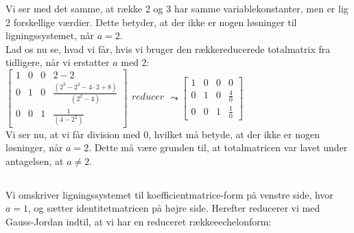 \documentclass[a4paper,12pt]{article}
\begin{document}
Vi ser med det samme, at række 2 og 3 har samme variablekonstanter, men er lig 2 forskellige værdier. Dette betyder, at der ikke er nogen løsninger til ligningssystemet, når $a=2$.\\

Lad os nu se, hvad vi får, hvis vi bruger den rækkereducerede totalmatrix fra tidligere, når vi erstatter $a$ med 2:\\

$
\left[\begin{array}{ccc|c}
    1 & 0 & 0 & 2-2 \\
    0 & 1 & 0 & \frac{(2^3 - 2^2 - 4\cdot 2 + 8)}{(2^2 - 4)} \\
    0 & 0 & 1 & \frac{1}{(4-2^2)}
\end{array}\right]
\begin{array}{ccc}
    \\
    reducer\\
    \\
\end{array}
\leadsto
\left[\begin{array}{ccc|c}
    1 & 0 & 0 & 0 \\
    0 & 1 & 0 & \frac{4}{0} \\
    0 & 0 & 1 & \frac{1}{0}
\end{array}\right]
$\\

Vi ser nu, at vi får division med 0, hvilket må betyde, at der ikke er nogen løsninger, når $a=2$. Dette må være grunden til, at totalmatricen var lavet under antagelsen, at $a\neq 2$.\\

\subsection{}
Vi omskriver ligningssystemet til koefficientmatrice-form på venstre side, hvor $a=1$, og sætter identitetmatricen på højre side. Herefter reducerer vi med Gauss-Jordan indtil, at vi har en reduceret rækkeeechelonform:\\
\end{document}
